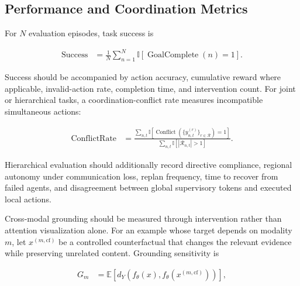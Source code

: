 \subsection{\textbf{Performance and Coordination Metrics}}

For $N$ evaluation episodes, task success is

\begin{equation}
\begin{aligned}
    \operatorname{Success}
    &= \frac{1}{N}\sum_{n=1}^{N}
       \mathbb{I}\!\left[
       \operatorname{GoalComplete}(n)=1
       \right].
\end{aligned}
\label{eq:task_success}
\end{equation}

Success should be accompanied by action accuracy, cumulative reward where applicable, invalid-action rate, completion time, and intervention count. For joint or hierarchical tasks, a coordination-conflict rate measures incompatible simultaneous actions:

\begin{equation}
\begin{aligned}
    \operatorname{ConflictRate}
    &= \frac{
       \sum_{n,t}
       \mathbb{I}\!\left[
       \operatorname{Conflict}
       \left(\{y_{n,t}^{(r)}\}_{r\in\mathcal{R}}\right)=1
       \right]
       }{
       \sum_{n,t}
       \mathbb{I}\!\left[
       |\mathcal{R}_{n,t}|>1
       \right]
       }.
\end{aligned}
\label{eq:coordination_conflict}
\end{equation}

Hierarchical evaluation should additionally record directive compliance, regional autonomy under communication loss, replan frequency, time to recover from failed agents, and disagreement between global supervisory tokens and executed local actions.

Cross-modal grounding should be measured through intervention rather than attention visualization alone. For an example whose target depends on modality $m$, let $x^{(m,\mathrm{cf})}$ be a controlled counterfactual that changes the relevant evidence while preserving unrelated content. Grounding sensitivity is

\begin{equation}
\begin{aligned}
    G_m
    &= \mathbb{E}\!\left[
       d_Y\!\left(
       f_{\theta}(x),
       f_{\theta}(x^{(m,\mathrm{cf})})
       \right)
       \right],
\end{aligned}
\label{eq:grounding_intervention}
\end{equation}

